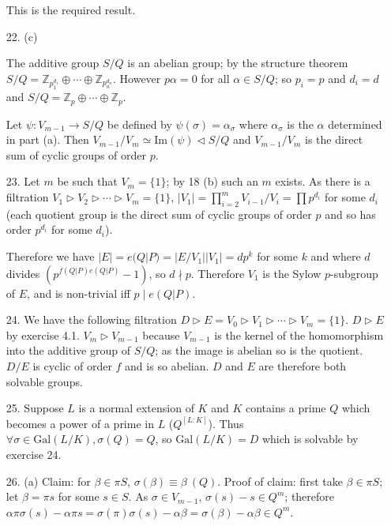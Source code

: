 \documentclass{article}
\newcommand{\Z}[0]{\mathbb{Z}}
\newcommand{\image}[1]{\text{Im}(#1)}
\newcommand{\modequiv}[3]{#1 \equiv #2\ (#3)}
\newcommand{\gal}[2]{\text{Gal}(#1 / #2)}
\begin{document}
\begin{enumerate}
This is the required result.

\item [22. (c)]

The additive group $S / Q$ is an abelian group; by the structure theorem $S / Q = \Z_{p_1^{d_1}} \oplus \cdots \oplus \Z_{p_n^{d_n}}$.  However $p\alpha = 0$ for all $\alpha \in S / Q$; so $p_i = p$ and $d_i = d$ and $S / Q = \Z_{p} \oplus \cdots \oplus \Z_{p}$.

Let $\psi : V_{m - 1} \to S / Q$ be defined by $\psi(\sigma) = \alpha_{\sigma}$ where $\alpha_{\sigma}$ is the $\alpha$ determined in part (a).  Then $V_{m - 1} / V_{m} \simeq \image{\psi} \triangleleft S / Q$ and $V_{m-1} / V_{m}$ is the direct sum of cyclic groups of order $p$.

\item [23.] Let $m$ be such that $V_{m} = \{1\}$; by 18 (b) such an $m$ exists.  As there is a filtration $V_1 \triangleright V_2 \triangleright \cdots \triangleright V_m = \{ 1 \}$, $|V_1| = \prod_{i = 2}^{m} V_{i - 1} / V_{i} = \prod p^{d_i}$ for some $d_i$ (each quotient group is the direct sum of cyclic groups of order $p$ and so has order $p^{d_i}$ for some $d_i$).

Therefore we have $|E| = e(Q|P) = |E/V_1||V_1| = d p^{k}$ for some $k$ and where $d$ divides $(p^{f(Q|P)e(Q|P)} - 1)$, so $d \nmid p$.  Therefore $V_1$ is the Sylow $p$-subgroup of $E$, and is non-trivial iff $p \mid e(Q|P)$.

\item [24.] We have the following filtration $D \triangleright E = V_0 \triangleright V_1 \triangleright \cdots \triangleright V_m = \{1\}$.  $D \triangleright E$ by exercise 4.1.  $V_m \triangleright V_{m-1}$ because $V_{m-1}$ is the kernel of the homomorphism into the additive group of $S / Q$; as the image is abelian so is the quotient.
$D / E$ is cyclic of order $f$ and is so abelian.  $D$ and $E$ are therefore both solvable groups.

\item [25.] Suppose $L$ is a normal extension of $K$ and $K$ contains a prime $Q$ which becomes a power of a prime in $L$ ($Q^{[L:K]}$).  Thus $\forall \sigma \in \gal{L}{K}, \sigma(Q) = Q$, so $\gal{L}{K} = D$ which is solvable by exercise 24.

\item [26. (a)]
Claim: for $\beta \in \pi S$, $\modequiv{\sigma(\beta)}{\beta}{Q}$.  Proof of claim: first take $\beta \in \pi S$; let $\beta = \pi s$ for some $s \in S$.  As $\sigma \in V_{m - 1}$, $\sigma(s) - s \in Q^{m}$; therefore $\alpha \pi \sigma(s) - \alpha \pi s = \sigma(\pi)\sigma(s) - \alpha \beta = \sigma(\beta) - \alpha \beta\in Q^{m}$.


\end{enumerate}
\end{document}
